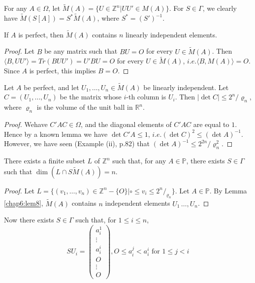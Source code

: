 For any $A \in \Omega$, let $\tilde{M}(A)=\bigg\{U \in
\mathbb{Z}^n|UU'\in M(A) \bigg\}$. For $S \in \Gamma $, we clearly
have $\tilde{M}(S[A])=S^* \tilde{M}(A)$, where $S^*=(S')^{-1}$. 

\begin{lem}\label{chap6:lem8}%
  If $A$ is perfect, then $\tilde{M}(A)$ contains $n$ linearly
  independent elements. 
\end{lem}

\begin{proof}
  Let $B$ be any matrix such that $BU=O$ for every $U \in
  \tilde{M}(A)$. Then $\langle B, UU' \rangle =Tr (BUU')=U'BU=O$ for
  every $U \in \tilde{M}(A)$, $i.e. \langle B, M(A) \rangle =O$. Since
  $A$ is perfect, this implies $B=O$. 
\end{proof}

\begin{lem}\label{chap6:lem9}%
  Let $A$ be perfect, and let $U_1, \ldots , U_n \in \tilde{M}(A)$ be
  linearly independent. Let $C=(U_1, \ldots , U_n)$ be the matrix whose
  $i$-th column is $U_i$. Then $| \det C| \leq 2^n/\varrho_n$, where
  $\varrho_n$ is the volume of the unit ball in $\mathbb{R}^n$. 
\end{lem}

\begin{proof}
  We\pageoriginale have $C'A C \in \Omega$, and the diagonal elements of $C'A C$ are
  equal to $1$. Hence by a known lemma we have $\det C' A \leq 1$,
  $i.e.(\det C)^2 \leq (\det A)^{-1}$. However, we have seen (Example
  (ii), p.82) that $(\det A)^{-1} \leq 2^{2n}/\varrho ^2_n$. 
\end{proof}

\begin{lem}\label{chap6:lem10}%
  There exists a finite subset $L$ of $\mathbb{Z}^n$ such that, for any
  $A \in \mathbb{P}$, there exists $S \in \Gamma$ such that $\dim (L
  \cap S \tilde{M}(A))=n$. 
\end{lem}

\begin{proof}
  Let $L= \bigg\{(v_1,\ldots ,v_n) \in \mathbb{Z}^n-\{O\}|\circ \leq v_i
  \leq 2^n/_{\varrho_n}\bigg \}$.  Let $A \in \mathbb{P}$.  By Lemma
  \ref{chap6:lem8}, $\tilde{M}(A)$ contains $n$ independent elements $U_1 \, \ldots ,
  U_n$. 
\end{proof}

Now there exists $S \in \Gamma $ such that, for $1 \leq i \leq n$,
\begin{equation*}
  SU_i =
  \begin{pmatrix}
    a^1_i \\ \vdots \\ a^i_i \\ O \\ \vdots \\ O
  \end{pmatrix}
  ,O \leq a^j_i < a^i_i \text{ for }1 \leq  j < i
\end{equation*}

